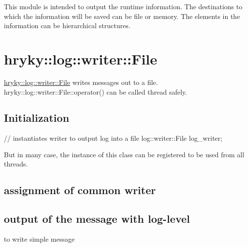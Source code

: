This module is intended to output the runtime information. The destinations to which the information will be saved can be file or memory. The elements in the information can be hierarchical structures.\hypertarget{hryky_1_1log_writer_File}{}\section{hryky\-::log\-::writer\-::\-File}\label{hryky_1_1log_writer_File}
\hyperlink{classhryky_1_1log_1_1writer_1_1_file}{hryky\-::log\-::writer\-::\-File} writes messages out to a file. hryky\-::log\-::writer\-::\-File\-::operator() can be called thread safely.

\hypertarget{hryky_1_1task_Initialization}{}\subsection{Initialization}\label{hryky_1_1task_Initialization}

\begin{DoxyCodeInclude}
        \textcolor{comment}{// instantiates writer to output log into a file}
        log::writer::File log\_writer;

\end{DoxyCodeInclude}


But in many case, the instance of this class can be registered to be used from all threads.\hypertarget{hryky_1_1log_registration}{}\subsection{assignment of common writer}\label{hryky_1_1log_registration}

\begin{DoxyCodeInclude}

\end{DoxyCodeInclude}
\hypertarget{hryky_1_1log_logging}{}\subsection{output of the message with log-\/level}\label{hryky_1_1log_logging}
to write simple message 
\begin{DoxyCodeInclude}

\end{DoxyCodeInclude}



\begin{DoxyCodeInclude}

\end{DoxyCodeInclude}


